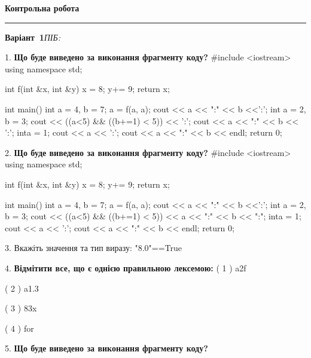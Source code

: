 \documentclass[11pt]{article}
\begin{document}
{\centering\Large\bfseries Контрольна робота\par}
\medskip
\noindent\rule{\linewidth}{0.5pt}
\smallskip
\noindent\textbf{Варіант \No\,1}\hfill \textit{ПІБ:}\,\underline{\hspace{60mm}}
\vspace{4mm}

1. \textbf{Що буде виведено за виконання фрагменту коду?}
#include <iostream>
using namespace std;

int f(int &x, int &y){
    x = 8;
    y+= 9;
    return x;
}

int main(){
    int a = 4, b = 7;
    a = f(a, a);
    cout << a << ":" << b <<':';
    {
        int a = 2, b = 3;
        cout << ((a<5) && ((b+=1) < 5)) << ':';
        cout << a << ":" << b << ':';
    }
    {
        inta = 1;
        cout << a << ':';
    }
    cout << a << ":" << b << endl;
    return 0;
}

\par\vspace{5mm}

2. \textbf{Що буде виведено за виконання фрагменту коду?}
#include <iostream>
using namespace std;

int f(int &x, int &y){
    x = 8;
    y+= 9;
    return x;
}

int main(){
    int a = 4, b = 7;
    a = f(a, a);
    cout << a << ":" << b <<':';
    {
        int a = 2, b = 3;
        cout << ((a<5) && ((b+=1) < 5))
             << a << ":" << b << ":";
    }
    {
        inta = 1;
        cout << a << ':';
    }
    cout << a << ":" << b << endl;
    return 0;
}

\par\vspace{5mm}

3. 
Вкажіть значення та тип виразу:
"8.0"==True
\par\vspace{5mm}

4. %
\textbf{Відмітити все, що є однією правильною лексемою:}
( 1 ) a2f

( 2 ) a1.3

( 3 ) 83x

( 4 ) for
\par\vspace{5mm}

5. \textbf{Що буде виведено за виконання фрагменту коду?}
\end{document}
